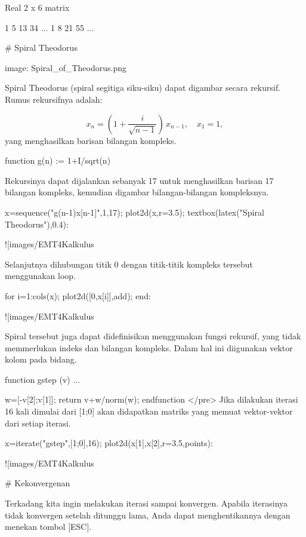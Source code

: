 \documentclass{article}
\begin{document}
    Real 2 x 6 matrix
    
                1             5            13            34     ...
                1             8            21            55     ...

# Spiral Theodorus

image: Spiral_of_Theodorus.png


Spiral Theodorus (spiral segitiga siku-siku) dapat digambar secara
rekursif. Rumus rekursifnya adalah:


$$x_n = \left( 1 + \frac{i}{\sqrt{n-1}} \right) \, x_{n-1}, \quad x_1=1,$$yang menghasilkan barisan bilangan kompleks.


\>function g(n) := 1+I/sqrt(n)


Rekursinya dapat dijalankan sebanyak 17 untuk menghasilkan barisan 17 bilangan kompleks,
kemudian digambar bilangan-bilangan kompleksnya.


\>x=sequence("g(n-1)\*x[n-1]",1,17); plot2d(x,r=3.5); textbox(latex("Spiral\\ Theodorus"),0.4):


![images/EMT4Kalkulus%

Selanjutnya dihubungan titik 0 dengan titik-titik kompleks tersebut menggunakan loop.


\>for i=1:cols(x); plot2d([0,x[i]],\>add); end:


![images/EMT4Kalkulus%

\> 


Spiral tersebut juga dapat didefinisikan menggunakan fungsi rekursif, yang tidak memmerlukan
indeks dan bilangan kompleks. Dalam hal ini diigunakan vektor kolom pada bidang.


\>function gstep (v) ...


    w=[-v[2];v[1]];
    return v+w/norm(w);
    endfunction
</pre>
Jika dilakukan iterasi 16 kali dimulai dari [1;0] akan didapatkan matriks yang memuat
vektor-vektor dari setiap iterasi.


\>x=iterate("gstep",[1;0],16); plot2d(x[1],x[2],r=3.5,\>points):


![images/EMT4Kalkulus%

# Kekonvergenan

Terkadang kita ingin melakukan iterasi sampai konvergen. Apabila iterasinya tidak konvergen
setelah ditunggu lama, Anda dapat menghentikannya dengan menekan tombol [ESC].
\end{document}
